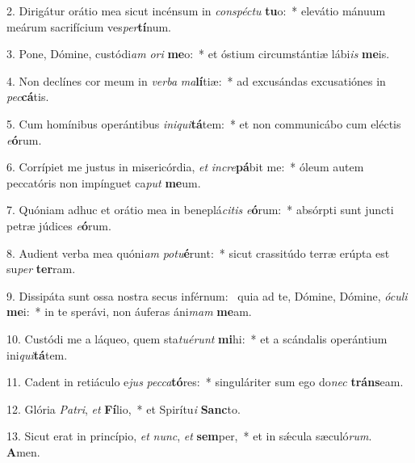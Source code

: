 2. Dirigátur orátio mea sicut incénsum in \textit{con}\textit{spéc}\textit{tu} \textbf{tu}o:~*  elevátio mánuum meárum sacrifícium ves\textit{per}\textbf{tí}num.\

3. Pone, Dómine, custódi\textit{am} \textit{o}\textit{ri} \textbf{me}o:~*  et óstium circumstántiæ lábi\textit{is} \textbf{me}is.\

4. Non declínes cor meum in \textit{ver}\textit{ba} \textit{ma}\textbf{lí}tiæ:~*  ad excusándas excusatiónes in \textit{pec}\textbf{cá}tis.\

5. Cum homínibus operántibus \textit{in}\textit{i}\textit{qui}\textbf{tá}tem:~*  et non communicábo cum eléctis \textit{e}\textbf{ó}rum.\

6. Corrípiet me justus in misericórdia, \textit{et} \textit{in}\textit{cre}\textbf{pá}bit me:~*  óleum autem peccatóris non impínguet ca\textit{put} \textbf{me}um.\

7. Quóniam adhuc et orátio mea in beneplá\textit{ci}\textit{tis} \textit{e}\textbf{ó}rum:~*  absórpti sunt juncti petræ júdices \textit{e}\textbf{ó}rum.\

8. Audient verba mea quóni\textit{am} \textit{pot}\textit{u}\textbf{é}runt:~*  sicut crassitúdo terræ erúpta est su\textit{per} \textbf{ter}ram.\

9. Dissipáta sunt ossa nostra secus inférnum: \dag\  quia ad te, Dómine, Dómine, \textit{ó}\textit{cu}\textit{li} \textbf{me}i:~*  in te sperávi, non áuferas áni\textit{mam} \textbf{me}am.\

10. Custódi me a láqueo, quem sta\textit{tu}\textit{é}\textit{runt} \textbf{mi}hi:~*  et a scándalis operántium ini\textit{qui}\textbf{tá}tem.\

11. Cadent in retiáculo e\textit{jus} \textit{pec}\textit{ca}\textbf{tó}res:~*  singuláriter sum ego do\textit{nec} \textbf{tráns}eam.\

12. Glória \textit{Pa}\textit{tri}, \textit{et} \textbf{Fí}lio,~*  et Spirítu\textit{i} \textbf{Sanc}to.\

13. Sicut erat in princípio, \textit{et} \textit{nunc}, \textit{et} \textbf{sem}per,~*  et in sǽcula sæculó\textit{rum}. \textbf{A}men.\

